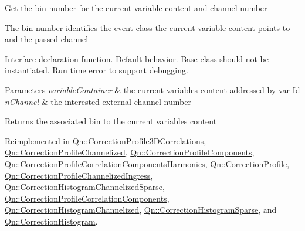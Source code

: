Get the bin number for the current variable content and channel number

The bin number identifies the event class the current variable content points to and the passed channel

Interface declaration function. Default behavior. \mbox{\hyperlink{classBase}{Base}} class should not be instantiated. Run time error to support debugging.


\begin{DoxyParams}{Parameters}
{\em variable\+Container} & the current variables content addressed by var Id \\
\hline
{\em n\+Channel} & the interested external channel number \\
\hline
\end{DoxyParams}
\begin{DoxyReturn}{Returns}
the associated bin to the current variables content 
\end{DoxyReturn}


Reimplemented in \mbox{\hyperlink{classQn_1_1CorrectionProfile3DCorrelations_ae46e3ba4225d3640de7c2e5da8882c9f}{Qn\+::\+Correction\+Profile3\+D\+Correlations}}, \mbox{\hyperlink{classQn_1_1CorrectionProfileChannelized_a10eb9b98a847afecf08e01e4e82bd4c5}{Qn\+::\+Correction\+Profile\+Channelized}}, \mbox{\hyperlink{classQn_1_1CorrectionProfileComponents_ad3899de482c6f1f6a32d317b76e87a8a}{Qn\+::\+Correction\+Profile\+Components}}, \mbox{\hyperlink{classQn_1_1CorrectionProfileCorrelationComponentsHarmonics_af500f2c1e6751686dfb060c268e9cef5}{Qn\+::\+Correction\+Profile\+Correlation\+Components\+Harmonics}}, \mbox{\hyperlink{classQn_1_1CorrectionProfile_ae670aae7149b53f64bf8461d1423f28d}{Qn\+::\+Correction\+Profile}}, \mbox{\hyperlink{classQn_1_1CorrectionProfileChannelizedIngress_aa9e937955e58199dedc3a75e5d593aa2}{Qn\+::\+Correction\+Profile\+Channelized\+Ingress}}, \mbox{\hyperlink{classQn_1_1CorrectionHistogramChannelizedSparse_a02df93ea7f488eab8cd0c781c1c71808}{Qn\+::\+Correction\+Histogram\+Channelized\+Sparse}}, \mbox{\hyperlink{classQn_1_1CorrectionProfileCorrelationComponents_a743cd351750d847bfc638d15218cbfa8}{Qn\+::\+Correction\+Profile\+Correlation\+Components}}, \mbox{\hyperlink{classQn_1_1CorrectionHistogramChannelized_a2491d6649af34766c3e848db8ed6e796}{Qn\+::\+Correction\+Histogram\+Channelized}}, \mbox{\hyperlink{classQn_1_1CorrectionHistogramSparse_a1b0edb414fa4594421f44a793b0fc87a}{Qn\+::\+Correction\+Histogram\+Sparse}}, and \mbox{\hyperlink{classQn_1_1CorrectionHistogram_a008557e4ab70595b83f60973acc37be2}{Qn\+::\+Correction\+Histogram}}.

